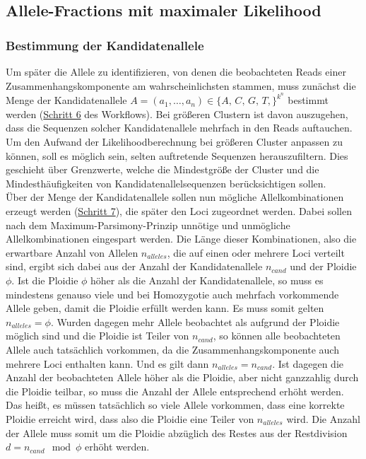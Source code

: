 \subsection{Allele-Fractions mit maximaler Likelihood} \label{subsec:sol_allele_lh}
\subsubsection{Bestimmung der Kandidatenallele} \label{subsec:sol_cand_allele}

Um später die Allele zu identifizieren, von denen die beobachteten Reads einer Zusammenhangskomponente am wahrscheinlichsten stammen, muss zunächst die Menge der Kandidatenallele $A=(a_{1}, \dots, a_{n}) \in \{A,\,C,\,G,\,T,\}^{k^n}$ bestimmt werden (\hyperref[step6]{Schritt 6\label{step6txt}} des Workflows). Bei größeren Clustern ist davon auszugehen, dass die Sequenzen solcher Kandidatenallele mehrfach in den Reads auftauchen. Um den Aufwand der Likelihoodberechnung bei größeren Cluster anpassen zu können, soll es möglich sein, selten auftretende Sequenzen herauszufiltern. Dies geschieht über Grenzwerte, welche die Mindestgröße der Cluster und die Mindesthäufigkeiten von Kandidatenallelsequenzen berücksichtigen sollen. \\

Über der Menge der Kandidatenallele sollen nun mögliche Allelkombinationen erzeugt werden (\hyperref[step7]{Schritt 7\label{step7txt}}), die später den Loci zugeordnet werden. Dabei sollen nach dem Maximum-Parsimony-Prinzip unnötige und unmögliche Allelkombinationen eingespart werden. Die Länge dieser Kombinationen, also die erwartbare Anzahl von Allelen $n_{alleles}$, die auf einen oder mehrere Loci verteilt sind, ergibt sich dabei aus der Anzahl der Kandidatenallele $n_{cand}$ und der Ploidie $\phi$. Ist die Ploidie $ \phi $ höher als die Anzahl der Kandidatenallele, so muss es mindestens genauso viele und bei Homozygotie auch mehrfach vorkommende Allele geben, damit die Ploidie erfüllt werden kann. Es muss somit gelten $ n_{alleles} = \phi $. Wurden dagegen mehr Allele beobachtet als aufgrund der Ploidie möglich sind und die Ploidie ist Teiler von $n_{cand}$, so können alle beobachteten Allele auch tatsächlich vorkommen, da die Zusammenhangskomponente auch mehrere Loci enthalten kann. Und es gilt dann $ n_{alleles} = n_{cand} $. Ist dagegen die Anzahl der beobachteten Allele höher als die Ploidie, aber nicht ganzzahlig durch die Ploidie teilbar, so muss die Anzahl der Allele entsprechend erhöht werden. Das heißt, es müssen tatsächlich so viele Allele vorkommen, dass eine korrekte Ploidie erreicht wird, dass also die Ploidie eine Teiler von $ n_{alleles} $ wird. Die Anzahl der Allele muss somit um die Ploidie abzüglich des Restes aus der Restdivision $d=n_{cand} \mod \phi$ erhöht werden.

